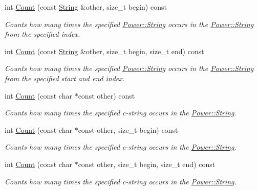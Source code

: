 \begin{DoxyCompactItemize}
int \hyperlink{class_power_1_1_string_a0f03e2c894d116eed594ca5c36befa74}{Count} (const \hyperlink{class_power_1_1_string}{String} \&other, size\+\_\+t begin) const
\begin{DoxyCompactList}\small\item\em Counts how many times the specified \hyperlink{class_power_1_1_string}{Power\+::\+String} occurs in the \hyperlink{class_power_1_1_string}{Power\+::\+String} from the specified index. \end{DoxyCompactList}\item 
int \hyperlink{class_power_1_1_string_a76a12fa674ee5dd62d2ea85fe256f77e}{Count} (const \hyperlink{class_power_1_1_string}{String} \&other, size\+\_\+t begin, size\+\_\+t end) const
\begin{DoxyCompactList}\small\item\em Counts how many times the specified \hyperlink{class_power_1_1_string}{Power\+::\+String} occurs in the \hyperlink{class_power_1_1_string}{Power\+::\+String} from the specified start and end index. \end{DoxyCompactList}\item 
int \hyperlink{class_power_1_1_string_a033ce6d47b6bc59fb2f26e44371472c8}{Count} (const char $\ast$const other) const
\begin{DoxyCompactList}\small\item\em Counts how many times the specified c-\/string occurs in the \hyperlink{class_power_1_1_string}{Power\+::\+String}. \end{DoxyCompactList}\item 
int \hyperlink{class_power_1_1_string_ad68048bd773411926894154779f287e8}{Count} (const char $\ast$const other, size\+\_\+t begin) const
\begin{DoxyCompactList}\small\item\em Counts how many times the specified c-\/string occurs in the \hyperlink{class_power_1_1_string}{Power\+::\+String}. \end{DoxyCompactList}\item 
int \hyperlink{class_power_1_1_string_a94b28f08c545220d611d0f7082001a44}{Count} (const char $\ast$const other, size\+\_\+t begin, size\+\_\+t end) const
\begin{DoxyCompactList}\small\item\em Counts how many times the specified c-\/string occurs in the \hyperlink{class_power_1_1_string}{Power\+::\+String}. \end{DoxyCompactList}\item 

\end{DoxyCompactItemize}
